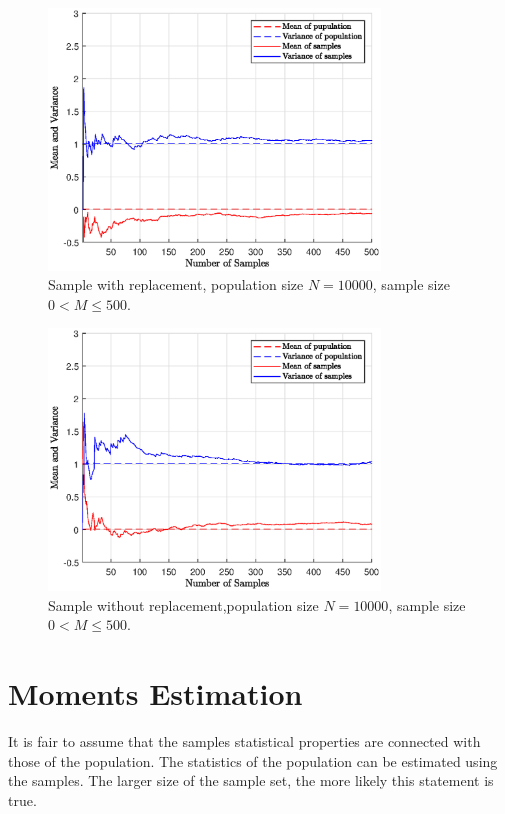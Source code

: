 \begin{figure}[!htb]
	\centering
	\includegraphics[width=250pt]{chapters/part-2/figures/sample-wr-n10000.eps}
	\caption{Sample with replacement, population size $N=10000$, sample size $0< M\leq500$.} \label{ch:sampling:fig:sample-wr-n10000}
\end{figure}

\begin{figure}[!htb]
	\centering
	\includegraphics[width=250pt]{chapters/part-2/figures/sample-nwr-n10000.eps}
	\caption{Sample without replacement,population size $N=10000$, sample size $0< M\leq500$.} \label{ch:sampling:fig:sample-nwr-n10000}
\end{figure}

\section{Moments Estimation}

It is fair to assume that the samples statistical properties are connected with those of the population. The statistics of the population can be estimated using the samples. The larger size of the sample set, the more likely this statement is true.

